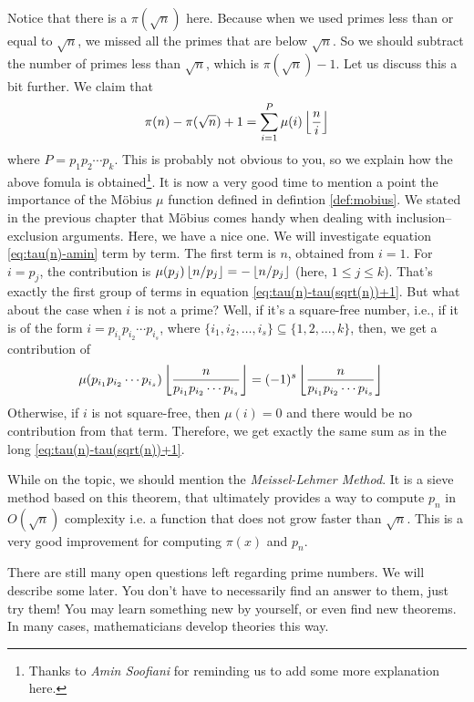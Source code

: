 Notice that there is a $\pi(\sqrt{n})$ here. Because when we used primes less than or equal to $\sqrt{n}$, we missed all the primes that are below $\sqrt{n}$. So we should subtract the number of primes less than $\sqrt{n}$, which is $\pi(\sqrt{n})-1$. Let us discuss this a bit further. We claim that
\begin{align}
	\pi(n) -\pi(\sqrt{n})+1 = \sum_{i=1}^{P}\mu(i)\left\lfloor{\frac{n}{i}}\right\rfloor\label{eq:tau(n)-amin}
\end{align}
where $P=p_1p_2\cdots p_k$. This is probably not obvious to you, so we explain how the above fomula is obtained\footnote{Thanks to \textit{Amin Soofiani} for reminding us to add some more explanation here.}. It is now a very good time to mention a point the importance of the M\" obius $\mu$ function defined in defintion \eqref{def:mobius}. We stated in the previous chapter that M\" obius comes handy when dealing with inclusion--exclusion arguments. Here, we have a nice one. We will investigate equation \eqref{eq:tau(n)-amin} term by term. The first term is $n$, obtained from $i=1$. For $i=p_j$, the contribution is $\mu(p_j)\left\lfloor{n/p_j}\right\rfloor=-\left\lfloor{n/p_j}\right\rfloor$ (here, $1 \leq j \leq k$). That's exactly the first group of terms in equation \eqref{eq:tau(n)-tau(sqrt(n))+1}. But what about the case when $i$ is not a prime? Well, if it's a square-free number, i.e., if it is of the form $i=p_{i_1}p_{i_2}\cdots p_{i_s}$, where $\{i_1, i_2, \ldots, i_s\} \subseteq \{1,2,\ldots,k\}$, then, we get a contribution of
\begin{align*}
	\mu(p_{i_1}p_{i_2}\cdots p_{i_s}) \left\lfloor{\frac{n}{p_{i_1}p_{i_2}\cdots p_{i_s}}}\right\rfloor
		& = (-1)^{s}\left\lfloor{\frac{n}{p_{i_1}p_{i_2}\cdots p_{i_s}}}\right\rfloor
\end{align*}
Otherwise, if $i$ is not square-free, then $\mu(i)=0$ and there would be no contribution from that term. Therefore, we get exactly the same sum as in the long \eqref{eq:tau(n)-tau(sqrt(n))+1}.


While on the topic, we should mention the \textit{Meissel-Lehmer Method}. It is a sieve method based on this theorem, that ultimately provides a way to compute $p_n$ in $O(\sqrt{n})$ complexity i.e. a function that does not grow faster than $\sqrt{n}$. This is a very good improvement for computing $\pi(x)$ and $p_n$.


There are still many open questions left regarding prime numbers. We will describe some later. You don't have to necessarily find an answer to them, just try them! You may learn something new by yourself, or even find new theorems. In many cases, mathematicians develop theories this way.

